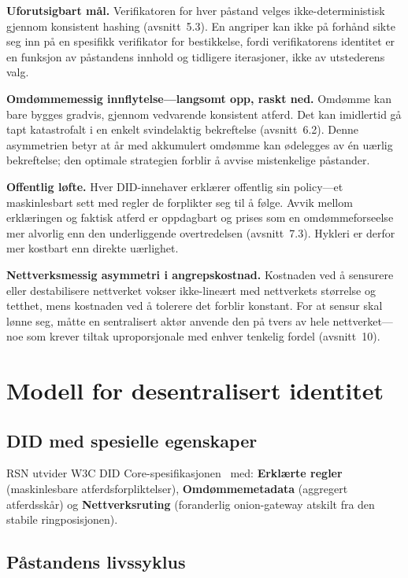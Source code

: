 \documentclass[11pt,a4paper,twocolumn]{article}
\begin{document}
\textbf{Uforutsigbart mål.} Verifikatoren for hver påstand velges ikke-deterministisk gjennom konsistent hashing (avsnitt~5.3). En angriper kan ikke på forhånd sikte seg inn på en spesifikk verifikator for bestikkelse, fordi verifikatorens identitet er en funksjon av påstandens innhold og tidligere iterasjoner, ikke av utstederens valg.

\textbf{Omdømmemessig innflytelse---langsomt opp, raskt ned.} Omdømme kan bare bygges gradvis, gjennom vedvarende konsistent atferd. Det kan imidlertid gå tapt katastrofalt i en enkelt svindelaktig bekreftelse (avsnitt~6.2). Denne asymmetrien betyr at år med akkumulert omdømme kan ødelegges av én uærlig bekreftelse; den optimale strategien forblir å avvise mistenkelige påstander.

\textbf{Offentlig løfte.} Hver DID-innehaver erklærer offentlig sin policy---et maskinlesbart sett med regler de forplikter seg til å følge. Avvik mellom erklæringen og faktisk atferd er oppdagbart og prises som en omdømmeforseelse mer alvorlig enn den underliggende overtredelsen (avsnitt~7.3). Hykleri er derfor mer kostbart enn direkte uærlighet.

\textbf{Nettverksmessig asymmetri i angrepskostnad.} Kostnaden ved å sensurere eller destabilisere nettverket vokser ikke-lineært med nettverkets størrelse og tetthet, mens kostnaden ved å tolerere det forblir konstant. For at sensur skal lønne seg, måtte en sentralisert aktør anvende den på tvers av hele nettverket---noe som krever tiltak uproporsjonale med enhver tenkelig fordel (avsnitt~10).

\section{Modell for desentralisert identitet}

\subsection{DID med spesielle egenskaper}

RSN utvider W3C DID Core-spesifikasjonen~\cite{did2022} med: \textbf{Erklærte regler} (maskinlesbare atferdsforpliktelser), \textbf{Omdømmemetadata} (aggregert atferdsskår) og \textbf{Nettverksruting} (foranderlig onion-gateway atskilt fra den stabile ringposisjonen).

\subsection{Påstandens livssyklus}
\end{document}
